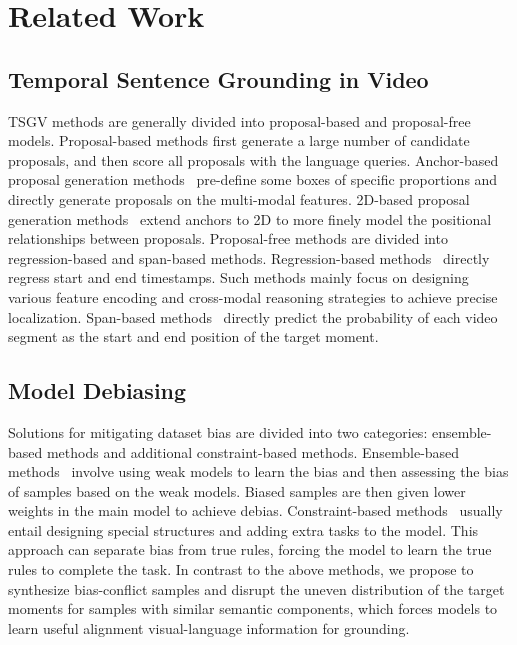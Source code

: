 \section{Related Work}

\subsection{Temporal Sentence Grounding in Video}

TSGV methods are generally divided into proposal-based and proposal-free models.
Proposal-based methods first generate a large number of candidate proposals, and then score all proposals with the language queries. 
Anchor-based proposal generation methods~\cite{RN8, RN9, RN10, RN11, RN5} pre-define some boxes of specific proportions and directly generate proposals on the multi-modal features. 2D-based proposal generation methods~\cite{RN2, RN13, RN14, RN15, RN16, RN17} extend anchors to 2D to more finely model the positional relationships between proposals.
Proposal-free methods are divided into regression-based and span-based methods. Regression-based methods~\cite{RN18, RN19, RN20, RN21, RN3, zheng2023generating, wang2023scene} directly regress start and end timestamps. Such methods mainly focus on designing various feature encoding and cross-modal reasoning strategies to achieve precise localization. Span-based methods~\cite{RN22, RN23, RN25, RN26, RN4, zheng2023phrase} directly predict the probability of each video segment as the start and end position of the target moment. 


\subsection{Model Debiasing}

Solutions for mitigating dataset bias are divided into two categories: ensemble-based methods and additional constraint-based methods.
Ensemble-based methods~\cite{RN34, RN36, RN28} involve using weak models to learn the bias and then assessing the bias of samples based on the weak models. Biased samples are then given lower weights in the main model to achieve debias. 
Constraint-based methods~\cite{RN30, RN35, RN29, lan2023curriculum, qi2023self, lan2022closer, yoon2023counterfactual} usually entail designing special structures and adding extra tasks to the model. This approach can separate bias from true rules, forcing the model to learn the true rules to complete the task. 
In contrast to the above methods, we propose to synthesize bias-conflict samples and disrupt the uneven distribution of the target moments for samples with similar semantic components, which forces models to learn useful alignment visual-language information for grounding.

